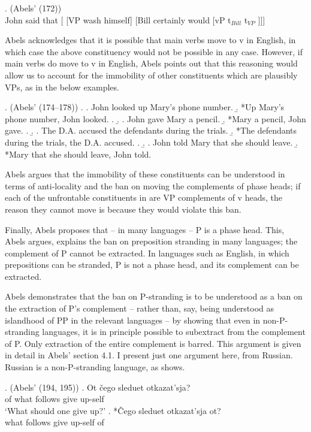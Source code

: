 \documentclass[11pt,letterpaper]{article}
\begin{document}
 \exi. (Abels' (172))\\
 	John said that [ [VP wash himself] [Bill certainly would [vP t$_{Bill}$ t$_{VP}$ ]]]
 	
 Abels acknowledges that it is possible that main verbs move to v in English, in which case the above constituency would not be possible in any case.
 However, if main verbs do move to v in English, Abels points out that this reasoning would allow us to account for the immobility of other constituents which are plausibly VPs, as in the below examples.
 
 \ex. (Abels' (174--178))
 	\a. 	\a. John looked up Mary's phone number.
 		\b. *Up Mary's phone number, John looked.
 		\z. 
 	\b.	\a. John gave Mary a pencil.
 		\b. *Mary a pencil, John gave.
 		\z.
 	\b.	\a. The D.A. accused the defendants during the trials.
 		\b. *The defendants during the trials, the D.A. accused.
 		\z.
 	\b. 	\a. John told Mary that she should leave.
 		\b. *Mary that she should leave, John told.
 		
 Abels argues that the immobility of these constituents can be understood in terms of anti-locality and the ban on moving the complements of phase heads; if each of the unfrontable constituents in \Last are VP complements of v heads, the reason they cannot move is because they would violate this ban.
 
 Finally, Abels proposes that -- in many languages -- P is a phase head.
 This, Abels argues, explains the ban on preposition stranding in many languages; the complement of P cannot be extracted. 
 In languages such as English, in which prepositions can be stranded, P is not a phase head, and its complement can be extracted.
 
 Abels demonstrates that the ban on P-stranding is to be understood as a ban on the extraction of P's complement -- rather than, say, being understood as islandhood of PP in the relevant languages -- by showing that even in non-P-stranding languages, it is in principle possible to subextract from the complement of P.
 Only extraction of the entire complement is barred.
 This argument is given in detail in Abels' section 4.1. I present just one argument here, from Russian.
 Russian is a non-P-stranding language, as \Next shows.
 
 \ex. (Abels' (194, 195))
 	\ag. Ot \v{c}ego sleduet otkazat'sja?\\
 		of what follows {give up-self}\\
 		`What should one give up?'
 	\bg.	*\v{C}ego sleduet otkazat'sja ot?\\
 		what follows {give up-self} of\\
 		
\end{document}
